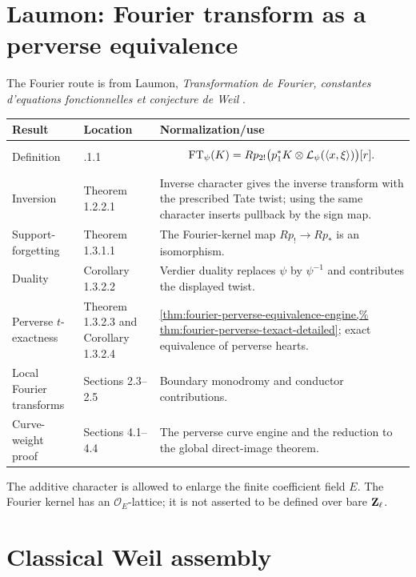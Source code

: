\section{Laumon: Fourier transform as a perverse equivalence}

The Fourier route is from Laumon,
\emph{Transformation de Fourier, constantes d'equations fonctionnelles et
conjecture de Weil} \cite{LaumonFourier}.

\begin{longtable}{
 >{\raggedright\arraybackslash}p{}
 >{\raggedright\arraybackslash}p{}
 >{\raggedright\arraybackslash}p{}}
\toprule
Result & Location & Normalization/use\\
\midrule
\endhead
Definition &
1.2.1.1 &
\[
 \operatorname{FT}_\psi(K)
  =Rp_{2!}
   \bigl(p_1^*K\otimes\mathcal L_\psi(\langle x,\xi\rangle)\bigr)[r].
\]\\

Inversion &
Theorem 1.2.2.1 &
Inverse character gives the inverse transform with the prescribed Tate
twist; using the same character inserts pullback by the sign map.\\

Support-forgetting &
Theorem 1.3.1.1 &
The Fourier-kernel map \(Rp_!\to Rp_*\) is an isomorphism.\\

Duality &
Corollary 1.3.2.2 &
Verdier duality replaces \(\psi\) by \(\psi^{-1}\) and contributes the
displayed twist.\\

Perverse \(t\)-exactness &
Theorem 1.3.2.3 and Corollary 1.3.2.4 &
\cref{thm:fourier-perverse-equivalence-engine,%
thm:fourier-perverse-texact-detailed}; exact equivalence of perverse hearts.\\

Local Fourier transforms &
Sections 2.3--2.5 &
Boundary monodromy and conductor contributions.\\

Curve-weight proof &
Sections 4.1--4.4 &
The perverse curve engine and the reduction to the global direct-image
theorem.\\
\bottomrule
\end{longtable}

The additive character is allowed to enlarge the finite coefficient field
\(E\).  The Fourier kernel has an \(\mathcal O_E\)-lattice; it is not
asserted to be defined over bare \(\mathbf Z_\ell\).

\section{Classical Weil assembly}

